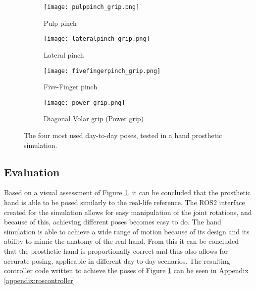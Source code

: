 \documentclass[../main.tex]{subfiles}
\begin{document}
\begin{figure}
    \centering
    \begin{subfigure}[b]{0.49\textwidth}
        \centering
        \texttt{[image: pulppinch\_grip.png]}
        \caption{Pulp pinch}
    \end{subfigure}
    \hfill
    \centering
    \begin{subfigure}[b]{0.49\textwidth}
        \centering
        \texttt{[image: lateralpinch\_grip.png]}
        \caption{Lateral pinch}
    \end{subfigure}
    \hfill
    \begin{subfigure}[b]{0.49\textwidth}
        \centering
        \texttt{[image: fivefingerpinch\_grip.png]}
        \caption{Five-Finger pinch}
    \end{subfigure}
    \hfill
    \begin{subfigure}[b]{0.49\textwidth}
        \centering
        \texttt{[image: power\_grip.png]}
        \caption{Diagonal Volar grip (Power grip)}
    \end{subfigure}
    \caption{The four most used day-to-day poses, tested in a hand prosthetic simulation.}
    \label{fig:hand_pose_test}
\end{figure}


\subsection{Evaluation}

Based on a visual assessment of Figure \ref{fig:hand_pose_test}, it can be concluded that the prosthetic hand is able to be posed similarly to the real-life reference.
The ROS2 \cite{ros2} interface created for the simulation allows for easy manipulation of the joint rotations, and because of this, achieving different poses becomes easy to do.
The hand simulation is able to achieve a wide range of motion because of its design and its ability to mimic the anatomy of the real hand.
From this it can be concluded that the prosthetic hand is proportionally correct and thus also allows for accurate posing, applicable in different day-to-day scenarios.
The resulting controller code written to achieve the poses of Figure \ref{fig:hand_pose_test} can be seen in Appendix \ref{appendix:roscontroller}.


%
\end{document}
